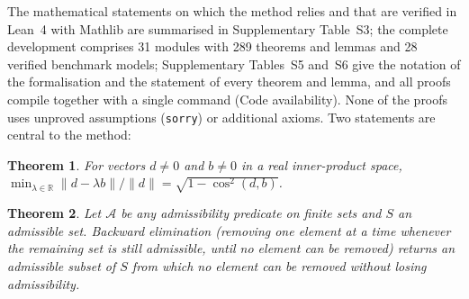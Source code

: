 \documentclass[pdflatex,sn-nature]{sn-jnl}
\theoremstyle{plain}
\newtheorem{theorem}{Theorem}
\begin{document}
The mathematical statements on which the method relies and that are verified in Lean~4 with Mathlib are summarised in Supplementary Table~S3; the complete development comprises 31 modules with 289 theorems and lemmas and 28 verified benchmark models; Supplementary Tables~S5 and~S6 give the notation of the formalisation and the statement of every theorem and lemma, and all proofs compile together with a single command (Code availability). None of the proofs uses unproved assumptions (\texttt{sorry}) or additional axioms. Two statements are central to the method:

\begin{theorem}\label{thm:cos}
For vectors $d\neq 0$ and $b\neq 0$ in a real inner-product space, $\min_{\lambda\in\mathbb{R}}\|d-\lambda b\|/\|d\| = \sqrt{1-\cos^2(d,b)}$.
\end{theorem}

\begin{theorem}\label{thm:prune}
Let $\mathcal{A}$ be any admissibility predicate on finite sets and $S$ an admissible set. Backward elimination (removing one element at a time whenever the remaining set is still admissible, until no element can be removed) returns an admissible subset of $S$ from which no element can be removed without losing admissibility.
\end{theorem}
\end{document}
